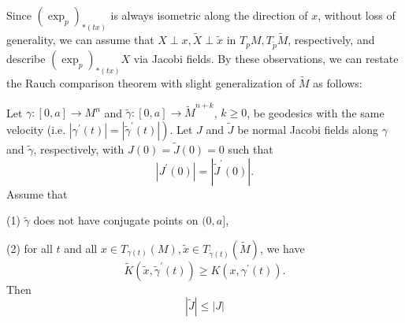 \documentclass{ctexart}
\begin{document}
Since $(\exp_{p})_{*(tx)}$ is always isometric along the direction of $x$, without loss of generality, we can assume that $X \perp x, \widetilde{X} \perp \widetilde{x}$ 
in $T_pM, T_{\widetilde{p}}\widetilde{M}$, respectively, and describe $(\exp_{p})_{*(tx)} X$ via Jacobi fields. 
By these observations, we can restate the Rauch comparison theorem with slight generalization of $\widetilde{M}$ as follows:
\begin{theorem}\label{RCT}
  Let $\gamma:[0, a] \rightarrow M^n$ and $\tilde{\gamma}:[0, a] \rightarrow \tilde{M}^{n+k}$, $k \geq 0$, be geodesics with the same velocity 
  (i.e. $\left.\left|\gamma^{\prime}(t)\right|=\left|\tilde{\gamma}^{\prime}(t)\right|\right)$. 
  Let $J$ and $\tilde{J}$ be normal Jacobi fields along $\gamma$ and $\tilde{\gamma}$, respectively, with $J(0)=\tilde{J}(0)=0$ such that
  $$
  \left|J^{\prime}(0)\right|=\left|\tilde{J}^{\prime}(0)\right| .
  $$
  Assume that 

  (1) $\tilde{\gamma}$ does not have conjugate points on $(0, a]$, 

  (2) for all $t$ and all $x \in T_{\gamma(t)}(M), \tilde{x} \in T_{\tilde{\gamma}(t)}(\tilde{M})$, we have
  $$
  \tilde{K}\left(\tilde{x}, \tilde{\gamma}^{\prime}(t)\right) \geq K\left(x, \gamma^{\prime}(t)\right). 
  $$
  Then
  $$
  |\tilde{J}| \leq|J|
  $$
\end{theorem}
\end{document}
